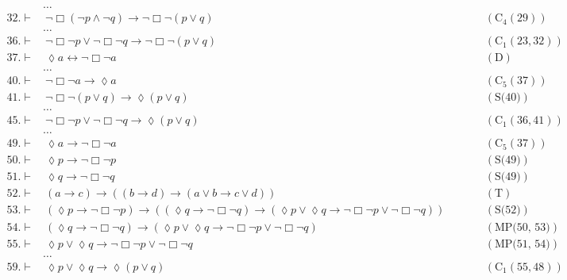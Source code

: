 \documentclass[a4paper, 12pt]{report}
\begin{document}
{{\begin{equation*}
\begin{alignedat}{2}
                               & \ldots && \\
                    32. \vdash & \ \lnot \Box (\lnot p \land \lnot q) \to \lnot \Box \lnot (p \lor q) && \quad \quad (\mbox{C}_4(29)) \\
                               & \ldots && \\
                    36. \vdash & \ \lnot \Box \lnot p \lor \lnot \Box \lnot q \to \lnot \Box \lnot (p \lor q) && \quad \quad (\mbox{C}_1(23, 32)) \\
                    37. \vdash & \ \lozenge a \leftrightarrow \lnot \Box \lnot a && \quad \quad (\mbox{D}) \\
                               & \ldots && \\
                    40. \vdash & \ \lnot \Box \lnot a \to \lozenge a && \quad \quad (\mbox{C}_5(37)) \\
                    41. \vdash & \ \lnot \Box \lnot (p \lor q) \to \lozenge (p \lor q) && \quad \quad (\mbox{S(40)}) \\
                               & \ldots && \\
                    45. \vdash & \ \lnot \Box \lnot p \lor \lnot \Box \lnot q \to \lozenge (p\lor q) && \quad \quad (\mbox{C}_1(36, 41)) \\
                               & \ldots && \\
                    49. \vdash & \ \lozenge a \to \lnot \Box \lnot a && \quad \quad (\mbox{C}_5(37)) \\
                    50. \vdash & \ \lozenge p \to \lnot \Box \lnot p && \quad \quad (\mbox{S(49)}) \\
                    51. \vdash & \ \lozenge q \to \lnot \Box \lnot q && \quad \quad (\mbox{S(49)}) \\
                    52. \vdash & \ (a \to c) \to ((b \to d) \to (a \lor b \to c \lor d)) && \quad \quad (\mbox{T}) \\
                    53. \vdash & \ (\lozenge p \to \lnot \Box \lnot p) \to ((\lozenge q \to \lnot \Box \lnot q) \to (\lozenge p \lor \lozenge q \to \lnot \Box \lnot p \lor \lnot \Box \lnot q)) && \quad \quad (\mbox{S(52)}) \\
                    54. \vdash & \ (\lozenge q \to \lnot \Box \lnot q) \to (\lozenge p \lor \lozenge q \to \lnot \Box \lnot p \lor \lnot \Box \lnot q) && \quad \quad (\mbox{MP(50, 53)}) \\
                    55. \vdash & \ \lozenge p \lor \lozenge q \to \lnot \Box \lnot p \lor \lnot \Box \lnot q && \quad \quad (\mbox{MP(51, 54)}) \\
                               & \ldots && \\
                    59. \vdash & \ \lozenge p \lor \lozenge q \to \lozenge (p \lor q) \ && \quad \quad (\mbox{C}_1(55, 48))
                \end{alignedat}
            \end{equation*}
        }

}
\end{document}

